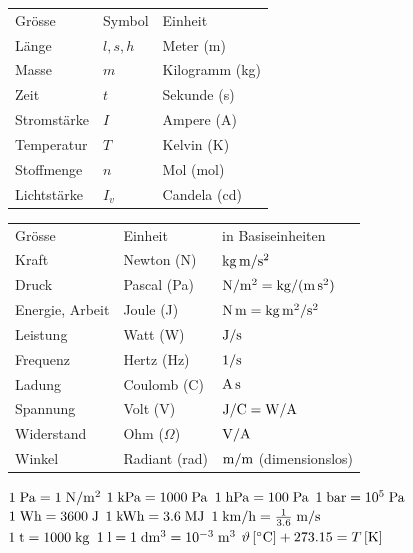 \begin{minipage}[t]{0.50\linewidth}\vspace{0pt}
{\footnotesize\setlength{\tabcolsep}{4pt}\renewcommand{\arraystretch}{1.15}
\begin{tabular}[t]{@{}l l l@{}}
\rowcolor{bernl} Grösse & Symbol & Einheit\\
Länge & \(l,s,h\) & Meter (m)\\
Masse & \(m\) & Kilogramm (kg)\\
Zeit & \(t\) & Sekunde (s)\\
Stromstärke & \(I\) & Ampere (A)\\
Temperatur & \(T\) & Kelvin (K)\\
Stoffmenge & \(n\) & Mol (mol)\\
Lichtstärke & \(I_v\) & Candela (cd)\\
\end{tabular}}

\vspace{1.2mm}
{\footnotesize\setlength{\tabcolsep}{4pt}\renewcommand{\arraystretch}{1.15}
\begin{tabular}[t]{@{}l l l@{}}
\rowcolor{bernl} Grösse & Einheit & in Basiseinheiten\\
Kraft & Newton (N) & \(\mathrm{kg\,m/s^2}\)\\
Druck & Pascal (Pa) & \(\mathrm{N/m^2}=\mathrm{kg/(m\,s^2)}\)\\
Energie, Arbeit & Joule (J) & \(\mathrm{N\,m}=\mathrm{kg\,m^2/s^2}\)\\
Leistung & Watt (W) & \(\mathrm{J/s}\)\\
Frequenz & Hertz (Hz) & \(1/\mathrm{s}\)\\
Ladung & Coulomb (C) & \(\mathrm{A\,s}\)\\
Spannung & Volt (V) & \(\mathrm{J/C}=\mathrm{W/A}\)\\
Widerstand & Ohm (\(\Omega\)) & \(\mathrm{V/A}\)\\
Winkel & Radiant (rad) & \(\mathrm{m/m}\) (dimensionslos)\\
\end{tabular}}

\vspace{1.2mm}
{\footnotesize
\(1\;\mathrm{Pa}=1\;\mathrm{N/m^2}\)\quad
\(1\;\mathrm{kPa}=1000\;\mathrm{Pa}\)\quad
\(1\;\mathrm{hPa}=100\;\mathrm{Pa}\)\quad
\(1\;\mathrm{bar}=10^{5}\;\mathrm{Pa}\)\\
\(1\;\mathrm{Wh}=3600\;\mathrm{J}\)\quad
\(1\;\mathrm{kWh}=3.6\;\mathrm{MJ}\)\quad
\(1\;\mathrm{km/h}=\tfrac{1}{3.6}\;\mathrm{m/s}\)\\
\(1\;\mathrm{t}=1000\;\mathrm{kg}\)\quad
\(1\;\mathrm{l}=1\;\mathrm{dm^3}=10^{-3}\;\mathrm{m^3}\)\quad
\(\vartheta\,[^\circ\mathrm{C}] + 273.15 = T\,[\mathrm{K}]\)\par}
\end{minipage}

